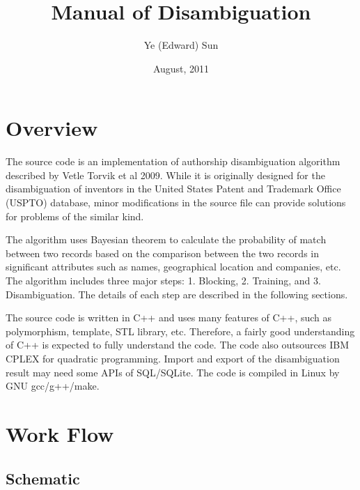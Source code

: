 \documentclass{article}
\begin{document}
\title{Manual of Disambiguation}
\author{Ye (Edward) Sun}
\date{August, 2011}
\maketitle

\section{Overview}

The source code is an implementation of authorship 
disambiguation algorithm described by Vetle
Torvik et al 2009. While it is originally designed 
for the disambiguation of inventors in the United
States Patent and Trademark Office (USPTO) database, 
minor modifications in the source file can
provide solutions for problems of the similar kind.

The algorithm uses Bayesian theorem to calculate the 
probability of match between two records based
on the comparison between the two records in significant 
attributes such as names, geographical location and companies, 
etc. The algorithm includes three major steps: 1. Blocking,
2. Training, and 3. Disambiguation.  The details of each 
step are described in the following sections.

The source code is written in C++ and uses many features 
of C++, such as polymorphism, template, STL library, etc. 
Therefore, a fairly good understanding of C++ is expected 
to fully understand the code. The code also outsources 
IBM CPLEX for quadratic programming. Import and export of the
disambiguation result may need some APIs of SQL/SQLite. 
The code is compiled in Linux by GNU gcc/g++/make.


\section{Work Flow}

\subsection{Schematic}
\end{document}
